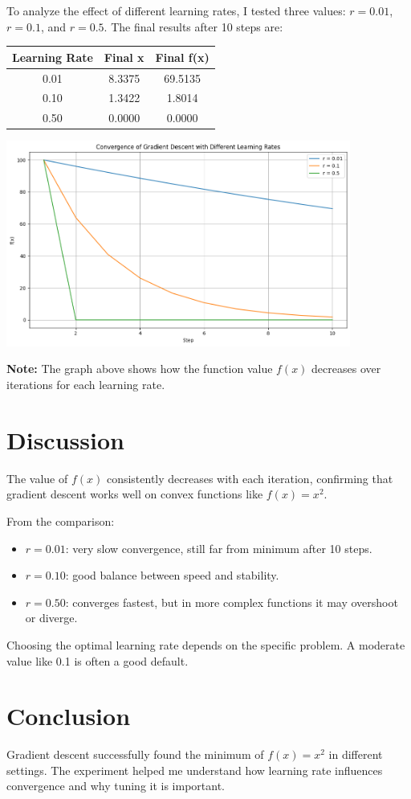 \documentclass{article}
\begin{document}
To analyze the effect of different learning rates, I tested three values: \( r = 0.01 \), \( r = 0.1 \), and \( r = 0.5 \). The final results after 10 steps are:

\begin{center}
\begin{tabular}{|c|c|c|}
\hline
Learning Rate & Final x & Final f(x) \\
\hline
0.01 & 8.3375 & 69.5135 \\
0.10 & 1.3422 & 1.8014 \\
0.50 & 0.0000 & 0.0000 \\
\hline
\end{tabular}
\end{center}

\begin{center}
\includegraphics[width=0.85\textwidth]{plot.png}
\end{center}

\textbf{Note:} The graph above shows how the function value \( f(x) \) decreases over iterations for each learning rate.

\section*{Discussion}

The value of \( f(x) \) consistently decreases with each iteration, confirming that gradient descent works well on convex functions like \( f(x) = x^2 \).

From the comparison:
\begin{itemize}
    \item \( r = 0.01 \): very slow convergence, still far from minimum after 10 steps.
    \item \( r = 0.10 \): good balance between speed and stability.
    \item \( r = 0.50 \): converges fastest, but in more complex functions it may overshoot or diverge.
\end{itemize}

Choosing the optimal learning rate depends on the specific problem. A moderate value like 0.1 is often a good default.

\section*{Conclusion}

Gradient descent successfully found the minimum of \( f(x) = x^2 \) in different settings. The experiment helped me understand how learning rate influences convergence and why tuning it is important.
\end{document}
